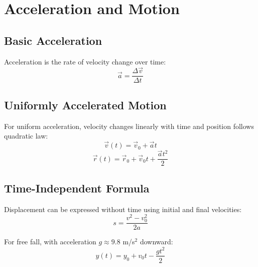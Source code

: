 \documentclass[12pt]{article}
\begin{document}
\section*{Acceleration and Motion}

\subsection*{Basic Acceleration}
Acceleration is the rate of velocity change over time:
\[
\vec a = \frac{\Delta\vec v}{\Delta t}
\]

\subsection*{Uniformly Accelerated Motion}
For uniform acceleration, velocity changes linearly with time and position follows quadratic law:
\[
\vec v(t) = \vec v_{0} + \vec at
\]
\[
\vec r(t) = \vec r_{0} + \vec v_{0}t + \frac{\vec at^{2}}{2}
\]

\subsection*{Time-Independent Formula}
Displacement can be expressed without time using initial and final velocities:
\[
s = \frac{v^{2} - v_{0}^{2}}{2a}
\]

For free fall, with acceleration $g \approx 9.8$ m/s$^2$ downward:
\[
y(t) = y_{0} + v_{0}t - \frac{gt^{2}}{2}
\]
\end{document}
